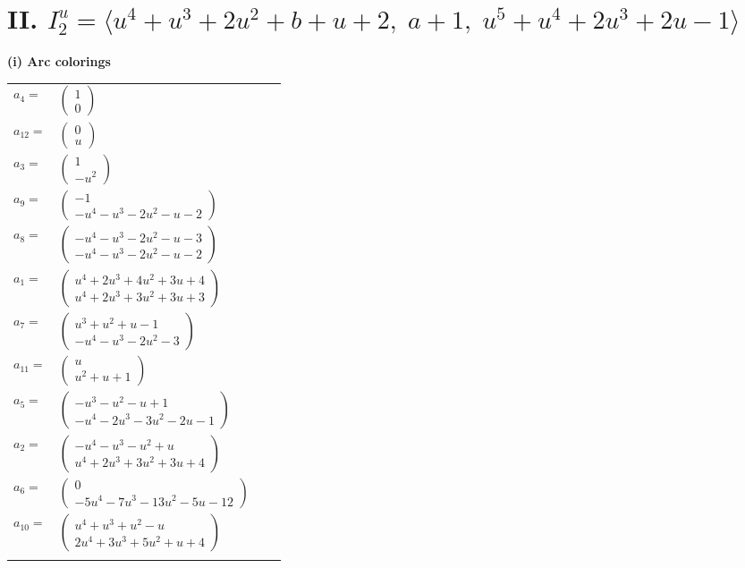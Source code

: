 \documentclass[1p]{elsarticle_modified}
\theoremstyle{definition}
\begin{document}
\centering \section*{II. $I^u_{2}= \langle u^4+u^3+2 u^2+b+u+2,\;a+1,\;u^5+u^4+2 u^3+2 u-1 \rangle$}
\flushleft \textbf{(i) Arc colorings}\\
\begin{tabular}{m{7pt} m{180pt} m{7pt} m{180pt} }
\flushright $a_{4}=$&$\begin{pmatrix}1\\0\end{pmatrix}$ \\
\flushright $a_{12}=$&$\begin{pmatrix}0\\u\end{pmatrix}$ \\
\flushright $a_{3}=$&$\begin{pmatrix}1\\- u^2\end{pmatrix}$ \\
\flushright $a_{9}=$&$\begin{pmatrix}-1\\- u^4- u^3-2 u^2- u-2\end{pmatrix}$ \\
\flushright $a_{8}=$&$\begin{pmatrix}- u^4- u^3-2 u^2- u-3\\- u^4- u^3-2 u^2- u-2\end{pmatrix}$ \\
\flushright $a_{1}=$&$\begin{pmatrix}u^4+2 u^3+4 u^2+3 u+4\\u^4+2 u^3+3 u^2+3 u+3\end{pmatrix}$ \\
\flushright $a_{7}=$&$\begin{pmatrix}u^3+u^2+u-1\\- u^4- u^3-2 u^2-3\end{pmatrix}$ \\
\flushright $a_{11}=$&$\begin{pmatrix}u\\u^2+u+1\end{pmatrix}$ \\
\flushright $a_{5}=$&$\begin{pmatrix}- u^3- u^2- u+1\\- u^4-2 u^3-3 u^2-2 u-1\end{pmatrix}$ \\
\flushright $a_{2}=$&$\begin{pmatrix}- u^4- u^3- u^2+u\\u^4+2 u^3+3 u^2+3 u+4\end{pmatrix}$ \\
\flushright $a_{6}=$&$\begin{pmatrix}0\\-5 u^4-7 u^3-13 u^2-5 u-12\end{pmatrix}$ \\
\flushright $a_{10}=$&$\begin{pmatrix}u^4+u^3+u^2- u\\2 u^4+3 u^3+5 u^2+u+4\end{pmatrix}$\\&\end{tabular}
\end{document}
